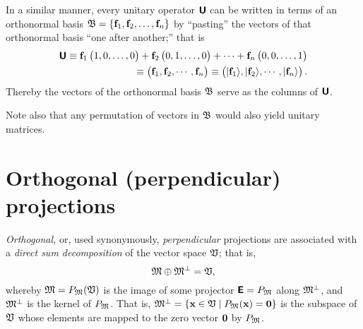 In a similar manner, every unitary operator  $\textsf{\textbf{U}}$  can be written in terms of an orthonormal basis
${\frak B}=\{{\bf f}_1,  {\bf f}_2, \ldots , {\bf f}_n\}$
by ``pasting'' the  vectors of that orthonormal basis ``one after another;''
that is
\begin{equation}
\begin{split}
\textsf{\textbf{U}}
\equiv
{\bf f}_1 \begin{pmatrix} 1,0,\ldots ,0\end{pmatrix} +
{\bf f}_2 \begin{pmatrix} 0,1,\ldots ,0\end{pmatrix} +
\cdots +
{\bf f}_n \begin{pmatrix} 0,0,\ldots ,1\end{pmatrix}   \\
\equiv
\begin{pmatrix}
{\bf f}_1,
{\bf f}_2,
\cdots,
{\bf f}_n
\end{pmatrix}
\equiv
\begin{pmatrix}
\vert {\bf f}_1 \rangle ,
\vert {\bf f}_2 \rangle ,
\cdots,
\vert {\bf f}_n \rangle
\end{pmatrix}
.
\end{split}
\label{2015-m-ch-fdlvs-uniascolv}
\end{equation}
Thereby the vectors of the orthonormal basis  ${\frak B}$ serve as the
columns of $\textsf{\textbf{U}}$.

Note also that any permutation of vectors in ${\frak B}$ would also yield unitary matrices.







\section{Orthogonal (perpendicular) projections}

{\em Orthogonal,} or, used synonymously,
{\em perpendicular} projections
are associated with a {\em direct sum decomposition} of the vector space ${\frak V}$;
that is,
\begin{equation}
 {\frak M}\oplus {\frak M}^\perp ={\frak V},
\label{2012-m-ch-fdvs-perp}
\end{equation}
whereby $ {\frak M}= P_{\frak M}({\frak V})$
is the image of some projector $\textsf{\textbf{E}}=P_{\frak M}$
along ${\frak M}^\perp$, and  ${\frak M}^\perp$ is
the kernel of $P_{\frak M}$.
That is, ${\frak M}^\perp = \left\{{\bf x} \in {\frak V} \mid P_{\frak M}({\bf x}) = {\bf 0}\right\}$
is the subspace of ${\frak V}$
whose elements are mapped to the zero vector ${\bf 0}$ by $P_{\frak M}$.


